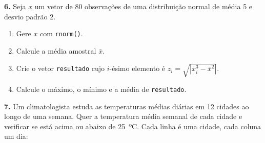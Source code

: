 \documentclass[
  portuguese,
  11pt,
  openany]{book}
\begin{document}
\textbf{6.} Seja \(x\) um vetor de 80 observações de uma distribuição normal de média 5 e
desvio padrão 2.

\begin{enumerate}
\def\labelenumi{(\alph{enumi})}
\item
  Gere \(x\) com \texttt{rnorm()}.
\item
  Calcule a média amostral \(\bar{x}\).
\item
  Crie o vetor \texttt{resultado} cujo \(i\)-ésimo elemento é
  \(z_i = \sqrt{\left| x_i^{3} - \bar{x}^{2} \right|}\).
\item
  Calcule o máximo, o mínimo e a média de \texttt{resultado}.
\end{enumerate}

\textbf{7.} Um climatologista estuda as temperaturas médias diárias em 12 cidades ao longo
de uma semana. Quer a temperatura média semanal de cada cidade e verificar se está
acima ou abaixo de 25~ºC. Cada linha é uma cidade, cada coluna um dia:
\end{document}
